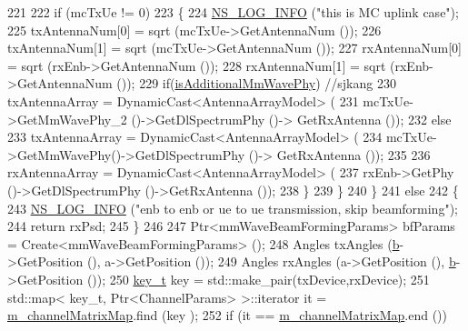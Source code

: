 \begin{DoxyCode}
221 
222                         \textcolor{keywordflow}{if} (mcTxUe != 0)
223                         \{
224                                 \hyperlink{group__logging_gafbd73ee2cf9f26b319f49086d8e860fb}{NS\_LOG\_INFO} (\textcolor{stringliteral}{"this is MC uplink case"});
225                                 txAntennaNum[0] = sqrt (mcTxUe->GetAntennaNum ());
226                                 txAntennaNum[1] = sqrt (mcTxUe->GetAntennaNum ());
227                                 rxAntennaNum[0] = sqrt (rxEnb->GetAntennaNum ());
228                                 rxAntennaNum[1] = sqrt (rxEnb->GetAntennaNum ());
229                                 \textcolor{keywordflow}{if}(\hyperlink{classns3_1_1MmWaveChannelMatrix_a6427b27c8ebd5fb5327c7403174caf31}{isAdditionalMmWavePhy}) \textcolor{comment}{//sjkang}
230                                 txAntennaArray = DynamicCast<AntennaArrayModel> (
231                                                         mcTxUe->GetMmWavePhy\_2 ()->GetDlSpectrumPhy ()->
      GetRxAntenna ());
232                                 \textcolor{keywordflow}{else}
233                                         txAntennaArray = DynamicCast<AntennaArrayModel> (
234                                                         mcTxUe->GetMmWavePhy()->GetDlSpectrumPhy ()->
      GetRxAntenna ());
235 
236                                 rxAntennaArray = DynamicCast<AntennaArrayModel> (
237                                                         rxEnb->GetPhy ()->GetDlSpectrumPhy ()->GetRxAntenna
       ());
238                         \}
239                 \} 
240         \}
241         \textcolor{keywordflow}{else}
242         \{
243                 \hyperlink{group__logging_gafbd73ee2cf9f26b319f49086d8e860fb}{NS\_LOG\_INFO} (\textcolor{stringliteral}{"enb to enb or ue to ue transmission, skip beamforming"});
244                 \textcolor{keywordflow}{return} rxPsd;
245         \}
246 
247         Ptr<mmWaveBeamFormingParams> bfParams = Create<mmWaveBeamFormingParams> ();
248         Angles txAngles (\hyperlink{buildings__pathloss_8m_a21ad0bd836b90d08f4cf640b4c298e7c}{b}->GetPosition (), a->GetPosition ());
249         Angles rxAngles (a->GetPosition (), \hyperlink{buildings__pathloss_8m_a21ad0bd836b90d08f4cf640b4c298e7c}{b}->GetPosition ());
250         \hyperlink{namespacens3_aa42bd408e172586b3b192acfaa36b070}{key\_t} key = std::make\_pair(txDevice,rxDevice);
251         std::map< key\_t, Ptr<ChannelParams> >::iterator it = \hyperlink{classns3_1_1MmWaveChannelMatrix_ad505ccb88c10f493fbba01d12732241f}{m\_channelMatrixMap}.find (key
      );
252         \textcolor{keywordflow}{if} (it == \hyperlink{classns3_1_1MmWaveChannelMatrix_ad505ccb88c10f493fbba01d12732241f}{m\_channelMatrixMap}.end ())

\end{DoxyCode}
